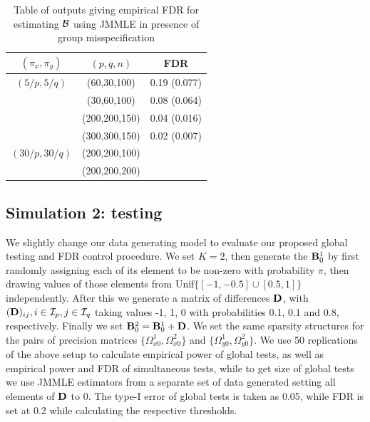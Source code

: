 \begin{scriptsize}
\begin{table}[ht]
\centering
    \begin{tabular}{ccc}
    \hline
    $(\pi_x, \pi_y)$ & $(p,q,n)$   & FDR        \\ \hline
    $(5/p, 5/q)$   & (60,30,100)   & 0.19 (0.077)\\
    ~              & (30,60,100)   & 0.08 (0.064)\\
    ~              & (200,200,150) & 0.04 (0.016)\\
    ~              & (300,300,150) & 0.02 (0.007)\\\hline
    $(30/p, 30/q)$ & (200,200,100) &              \\
    ~              & (200,200,200) & ~             \\ \hline
    \end{tabular}
    \caption{Table of outputs giving empirical FDR for estimating ${\cal{B}}$ using JMMLE in presence of group misspecification}
    \label{table:simtable22}
\end{table}
\end{scriptsize}

\subsection{Simulation 2: testing}
\label{sec:eval-testing}
We slightly change our data generating model to evaluate our proposed global testing and FDR control procedure. We set $K=2$, then generate the ${\mathbf{B}}_0^1$ by first randomly assigning each of its element to be non-zero with probability $\pi$, then drawing values of those elements from $\text{Unif}\{ [ -1, -0.5] \cup [0.5,1]\}$ independently. After this we generate a matrix of differences ${\mathbf{D}}$, with $({\mathbf{D}})_{ij}, i \in {\cal{I}}_p, j \in {\cal{I}}_q$ taking values -1, 1, 0 with probabilities 0.1, 0.1 and 0.8, respectively. Finally we set ${\mathbf{B}}_0^2 = {\mathbf{B}}_0^1 + {\mathbf{D}}$. We set the same sparsity structures for the pairs of precision matrices $\{ \Omega_{x0}^1, \Omega_{x0}^2 \}$ and $\{ \Omega_{y0}^1, \Omega_{y0}^2 \}$. We use 50 replications of the above setup to calculate empirical power of global tests, as well as empirical power and FDR of simultaneous tests, while to get size of global tests we use JMMLE estimators from a separate set of data generated setting all elements of ${\mathbf{D}}$ to 0. The type-I error of global tests is taken as 0.05, while FDR is set at 0.2 while calculating the respective thresholds.

